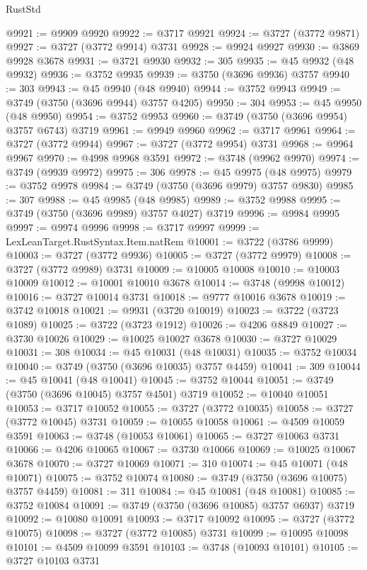 \begin{lexlean}{RustStd}
\begin{coremodule}
@9921 := @9909 @9920
@9922 := @3717 @9921
@9924 := @3727 (@3772 @9871)
@9927 := @3727 (@3772 @9914) @3731
@9928 := @9924 @9927
@9930 := @3869 @9928 @3678
@9931 := @3721 @9930
@9932 := 305
@9935 := @45 @9932 (@48 @9932)
@9936 := @3752 @9935
@9939 := @3750 (@3696 @9936) @3757
@9940 := 303
@9943 := @45 @9940 (@48 @9940)
@9944 := @3752 @9943
@9949 := @3749 (@3750 (@3696 @9944) @3757 @4205)
@9950 := 304
@9953 := @45 @9950 (@48 @9950)
@9954 := @3752 @9953
@9960 := @3749 (@3750 (@3696 @9954) @3757 @6743) @3719
@9961 := @9949 @9960
@9962 := @3717 @9961
@9964 := @3727 (@3772 @9944)
@9967 := @3727 (@3772 @9954) @3731
@9968 := @9964 @9967
@9970 := @4998 @9968 @3591
@9972 := @3748 (@9962 @9970)
@9974 := @3749 (@9939 @9972)
@9975 := 306
@9978 := @45 @9975 (@48 @9975)
@9979 := @3752 @9978
@9984 := @3749 (@3750 (@3696 @9979) @3757 @9830)
@9985 := 307
@9988 := @45 @9985 (@48 @9985)
@9989 := @3752 @9988
@9995 := @3749 (@3750 (@3696 @9989) @3757 @4027) @3719
@9996 := @9984 @9995
@9997 := @9974 @9996
@9998 := @3717 @9997
@9999 := LexLeanTarget.RustSyntax.Item.natRem
@10001 := @3722 (@3786 @9999)
@10003 := @3727 (@3772 @9936)
@10005 := @3727 (@3772 @9979)
@10008 := @3727 (@3772 @9989) @3731
@10009 := @10005 @10008
@10010 := @10003 @10009
@10012 := @10001 @10010 @3678
@10014 := @3748 (@9998 @10012)
@10016 := @3727 @10014 @3731
@10018 := @9777 @10016 @3678
@10019 := @3742 @10018
@10021 := @9931 (@3720 @10019)
@10023 := @3722 (@3723 @1089)
@10025 := @3722 (@3723 @1912)
@10026 := @4206 @8849
@10027 := @3730 @10026
@10029 := @10025 @10027 @3678
@10030 := @3727 @10029
@10031 := 308
@10034 := @45 @10031 (@48 @10031)
@10035 := @3752 @10034
@10040 := @3749 (@3750 (@3696 @10035) @3757 @4459)
@10041 := 309
@10044 := @45 @10041 (@48 @10041)
@10045 := @3752 @10044
@10051 := @3749 (@3750 (@3696 @10045) @3757 @4501) @3719
@10052 := @10040 @10051
@10053 := @3717 @10052
@10055 := @3727 (@3772 @10035)
@10058 := @3727 (@3772 @10045) @3731
@10059 := @10055 @10058
@10061 := @4509 @10059 @3591
@10063 := @3748 (@10053 @10061)
@10065 := @3727 @10063 @3731
@10066 := @4206 @10065
@10067 := @3730 @10066
@10069 := @10025 @10067 @3678
@10070 := @3727 @10069
@10071 := 310
@10074 := @45 @10071 (@48 @10071)
@10075 := @3752 @10074
@10080 := @3749 (@3750 (@3696 @10075) @3757 @4459)
@10081 := 311
@10084 := @45 @10081 (@48 @10081)
@10085 := @3752 @10084
@10091 := @3749 (@3750 (@3696 @10085) @3757 @6937) @3719
@10092 := @10080 @10091
@10093 := @3717 @10092
@10095 := @3727 (@3772 @10075)
@10098 := @3727 (@3772 @10085) @3731
@10099 := @10095 @10098
@10101 := @4509 @10099 @3591
@10103 := @3748 (@10093 @10101)
@10105 := @3727 @10103 @3731

\end{coremodule}
\end{lexlean}

